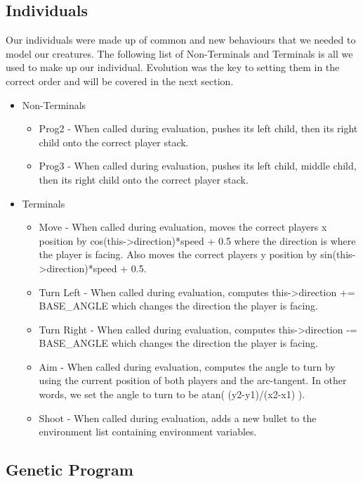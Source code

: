 \documentclass{acm_proc_article-sp}
\begin{document}
\subsection{Individuals} %
Our individuals were made up of common and new behaviours that we needed to model our creatures. The following list of Non-Terminals and Terminals is all we used to make up our individual. Evolution was the key to setting them in the correct order and will be covered in the next section.
\begin{itemize}
\item Non-Terminals
	\begin{itemize}
	\item Prog2 - When called during evaluation, pushes its left child, then its right child onto the correct player stack.
	\item Prog3 - When called during evaluation, pushes its left child, middle child, then its right child onto the correct player stack.
	\end{itemize}
\item Terminals
	\begin{itemize}
	\item Move - When called during evaluation, moves the correct players x position by cos(this->direction)*speed + 0.5 where the direction is where the player is facing. Also moves the correct players y position by sin(this->direction)*speed + 0.5.
	\item Turn Left - When called during evaluation, computes this->direction += BASE\_ANGLE which changes the direction the player is facing.
	\item Turn Right - When called during evaluation, computes this->direction -= BASE\_ANGLE which changes the direction the player is facing.
	\item Aim - When called during evaluation, computes the angle to turn by using the current position of both players and the arc-tangent. In other words, we set the angle to turn to be atan( (y2-y1)/(x2-x1) ).
	\item Shoot - When called during evaluation, adds a new bullet to the environment list containing environment variables.
	\end{itemize}
\end{itemize}

\subsection{Genetic Program} %
\end{document}
